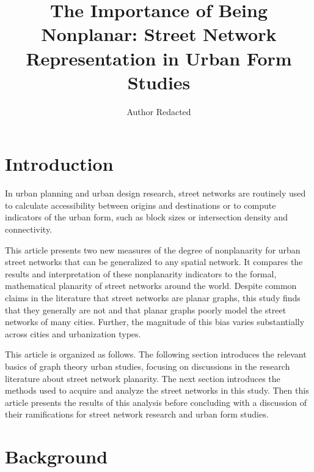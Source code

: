 \documentclass[Afour,sageh,times]{sagej}
\begin{document}
\title{The Importance of Being Nonplanar: Street Network Representation in Urban Form Studies}
\author{Author Redacted }


\begin{abstract}

\end{abstract}


\maketitle

\section{Introduction}

In urban planning and urban design research, street networks are routinely used to calculate accessibility between origins and destinations or to compute indicators of the urban form, such as block sizes or intersection density and connectivity.

This article presents two new measures of the degree of nonplanarity for urban street networks that can be generalized to any spatial network. It compares the results and interpretation of these nonplanarity indicators to the formal, mathematical planarity of street networks around the world. Despite common claims in the literature that street networks are planar graphs, this study finds that they generally are not and that planar graphs poorly model the street networks of many cities. Further, the magnitude of this bias varies substantially across cities and urbanization types.

This article is organized as follows. The following section introduces the relevant basics of graph theory urban studies, focusing on discussions in the research literature about street network planarity. The next section introduces the methods used to acquire and analyze the street networks in this study. Then this article presents the results of this analysis before concluding with a discussion of their ramifications for street network research and urban form studies.


\section{Background}
\end{document}
